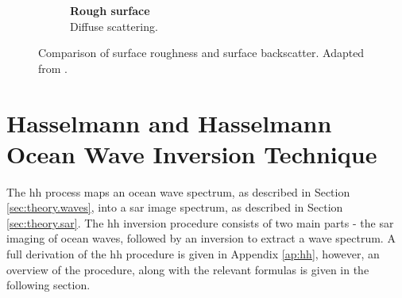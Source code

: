 \begin{figure} [htbp]
\begin{subfigure}{0.31\textwidth}
        \caption{\textbf{Rough surface} \\ Diffuse scattering.}
        \label{fig:theory.data.suface.diffuse}
    \end{subfigure}    
    \caption{Comparison of surface roughness and surface backscatter. Adapted from \cite{Meyer2019}.}
    \label{fig:theory.data.surface}
\end{figure}



\section{Hasselmann and Hasselmann Ocean Wave Inversion Technique} \label{sec:theory.hasselmann}
The \ac{hh} process maps an ocean wave spectrum, as described in Section \ref{sec:theory.waves}, into a \ac{sar} image spectrum, as described in Section \ref{sec:theory.sar}. The \ac{hh} inversion procedure consists of two main parts - the \acs{sar} imaging of ocean waves, followed by an inversion to extract a wave spectrum. A full derivation of the \ac{hh} procedure is given in Appendix \ref{ap:hh}, however, an overview of the procedure, along with the relevant formulas is given in the following section.

